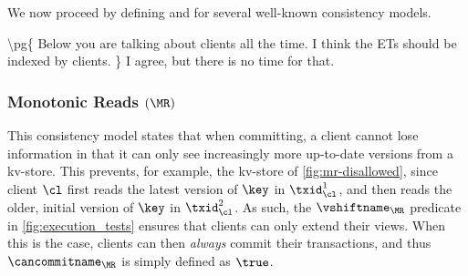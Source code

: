%

We now proceed by defining \vshiftname and \cancommitname for several well-known consistency models.

\ac{
\pg{

Below you are talking about clients all the time. I think the ETs
should be indexed by clients.

}
I agree, but there is no time for that.
}





\subsubsection{Monotonic Reads $(\MR)$}
This consistency model states that when committing, a client
cannot lose information in that it can only see increasingly more up-to-date versions from a kv-store.
This prevents, for example, the kv-store of \cref{fig:mr-disallowed},
since client $\cl$ first reads the latest version of $\key$ in $\txid_{\cl}^{1}$, 
and then reads the older, initial version of $\key$ in $\txid_{\cl}^{2}$.  
As such, the $\vshiftname_{\MR}$ predicate in \cref{fig:execution_tests} ensures that clients  can only extend their views. 
When this is the case, clients can then \emph{always} commit their transactions, and thus $\cancommitname_{\MR}$ is simply defined as $\true$. 
%
%

